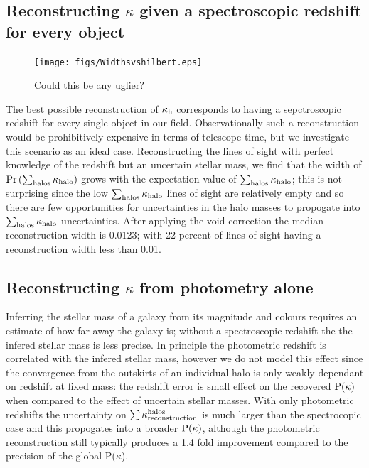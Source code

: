 \documentclass[useAMS,usenatbib]{mn2e}
\begin{document}
\subsection{Reconstructing $\kappa$ given a spectroscopic redshift for every object}

\begin{figure}
\texttt{[image: figs/Widthsvshilbert.eps]}
\caption[magcut]{Could this be any uglier?}
\label{fig:reconidths}
\end{figure}

The best possible reconstruction of $\kappa_{\rm h}$ corresponds to having a sepctroscopic redshift for every single object in our field. Observationally such a reconstruction would be prohibitively expensive in terms of telescope time, but we investigate this scenario as an ideal case. Reconstructing the lines of sight with perfect knowledge of the redshift but an uncertain stellar mass, we find that the width of ${\rm Pr}\left(\sum_{\rm halos} \kappa_{\rm halo} \right)$ grows with the expectation value of $\sum_{\rm halos} \kappa_{\rm halo}$; this is not surprising since the low $\sum_{\rm halos} \kappa_{\rm halo}$ lines of sight are relatively empty and so there are few opportunities for uncertainties in the halo masses to propogate into $\sum_{\rm halos} \kappa_{\rm halo}$ uncertainties. After applying the void correction the median reconstruction width is 0.0123; with 22 percent of lines of sight having a reconstruction width less than 0.01. 

\subsection{Reconstructing $\kappa$ from photometry alone}

Inferring the stellar mass of a galaxy from its magnitude and colours requires an estimate of how far away the galaxy is; without a spectroscopic redshift the the infered stellar mass is less precise. In principle the photometric redshift is correlated with the infered stellar mass, however we do not model this effect since the convergence from the outskirts of an individual halo is only weakly dependant on redshift at fixed mass: the redshift error is small effect on the recovered ${\rm P}(\kappa)$ when compared to the effect of uncertain stellar masses.  With only photometric redshifts the uncertainty on $\sum\kappa_{\rm reconstruction}^{\rm halos}$ is much larger than the spectrocopic case and this propogates into a broader ${\rm P}(\kappa)$, although the photometric reconstruction still typically produces a 1.4 fold improvement compared to the precision of the global P($\kappa$).
\end{document}
